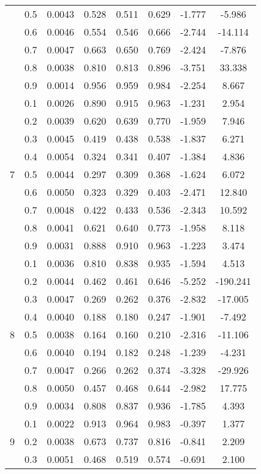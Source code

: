 \documentclass[11pt,a4paper]{report}
\begin{document}
\begin{longtable}{ | c | c || c | c | c | c | c | c | }
 & 0.5 & 0.0043 & 0.528 & 0.511 & 0.629 & -1.777 & -5.986 \\
 & 0.6 & 0.0046 & 0.554 & 0.546 & 0.666 & -2.744 & -14.114 \\
 & 0.7 & 0.0047 & 0.663 & 0.650 & 0.769 & -2.424 & -7.876 \\
 & 0.8 & 0.0038 & 0.810 & 0.813 & 0.896 & -3.751 & 33.338 \\
 & 0.9 & 0.0014 & 0.956 & 0.959 & 0.984 & -2.254 & 8.667 \\
 \hline
\multirow{9}{*}{7} & 0.1 & 0.0026 & 0.890 & 0.915 & 0.963 & -1.231 & 2.954 \\
 & 0.2 & 0.0039 & 0.620 & 0.639 & 0.770 & -1.959 & 7.946 \\
 & 0.3 & 0.0045 & 0.419 & 0.438 & 0.538 & -1.837 & 6.271 \\
 & 0.4 & 0.0054 & 0.324 & 0.341 & 0.407 & -1.384 & 4.836 \\
 & 0.5 & 0.0044 & 0.297 & 0.309 & 0.368 & -1.624 & 6.072 \\
 & 0.6 & 0.0050 & 0.323 & 0.329 & 0.403 & -2.471 & 12.840 \\
 & 0.7 & 0.0048 & 0.422 & 0.433 & 0.536 & -2.343 & 10.592 \\
 & 0.8 & 0.0041 & 0.621 & 0.640 & 0.773 & -1.958 & 8.118 \\
 & 0.9 & 0.0031 & 0.888 & 0.910 & 0.963 & -1.223 & 3.474 \\
 \hline
\multirow{9}{*}{8} & 0.1 & 0.0036 & 0.810 & 0.838 & 0.935 & -1.594 & 4.513 \\
 & 0.2 & 0.0044 & 0.462 & 0.461 & 0.646 & -5.252 & -190.241 \\
 & 0.3 & 0.0047 & 0.269 & 0.262 & 0.376 & -2.832 & -17.005 \\
 & 0.4 & 0.0040 & 0.188 & 0.180 & 0.247 & -1.901 & -7.492 \\
 & 0.5 & 0.0038 & 0.164 & 0.160 & 0.210 & -2.316 & -11.106 \\
 & 0.6 & 0.0040 & 0.194 & 0.182 & 0.248 & -1.239 & -4.231 \\
 & 0.7 & 0.0047 & 0.266 & 0.262 & 0.374 & -3.328 & -29.926 \\
 & 0.8 & 0.0050 & 0.457 & 0.468 & 0.644 & -2.982 & 17.775 \\
 & 0.9 & 0.0034 & 0.808 & 0.837 & 0.936 & -1.785 & 4.393 \\
 \hline
\multirow{9}{*}{9} & 0.1 & 0.0022 & 0.913 & 0.964 & 0.983 & -0.397 & 1.377 \\
 & 0.2 & 0.0038 & 0.673 & 0.737 & 0.816 & -0.841 & 2.209 \\
 & 0.3 & 0.0051 & 0.468 & 0.519 & 0.574 & -0.691 & 2.100 \\

\end{longtable}
\end{document}
